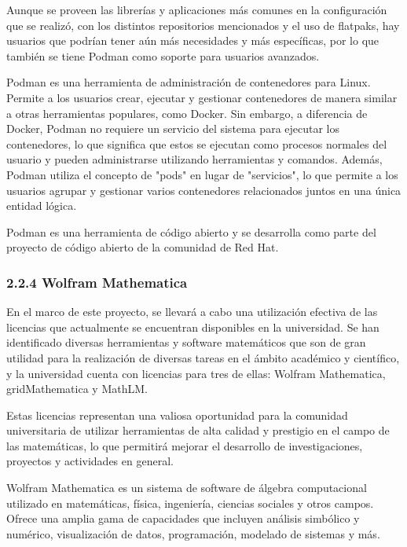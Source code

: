 \begin{spacing}{1.5}
    Aunque se proveen las librerías y aplicaciones más comunes en la configuración que se realizó, con los distintos repositorios mencionados y el uso de flatpaks, hay usuarios que podrían tener aún más necesidades y más específicas, por lo que también se tiene Podman como soporte para usuarios avanzados.

    Podman es una herramienta de administración de contenedores para Linux. Permite a los usuarios crear, ejecutar y gestionar contenedores de manera similar a otras herramientas populares, como Docker. Sin embargo, a diferencia de Docker, Podman no requiere un servicio del sistema para ejecutar los contenedores, lo que significa que estos se ejecutan como procesos normales del usuario y pueden administrarse utilizando herramientas y comandos. Además, Podman utiliza el concepto de "pods" en lugar de "servicios", lo que permite a los usuarios agrupar y gestionar varios contenedores relacionados juntos en una única entidad lógica. 
    
    Podman es una herramienta de código abierto y se desarrolla como parte del proyecto de código abierto de la comunidad de Red Hat. \cite{RHEL-podman-1}

    \subsubsection{2.2.4 Wolfram Mathematica}

    En el marco de este proyecto, se llevará a cabo una utilización efectiva de las licencias que actualmente se encuentran disponibles en la universidad. Se han identificado diversas herramientas y software matemáticos que son de gran utilidad para la realización de diversas tareas en el ámbito académico y científico, y la universidad cuenta con licencias para tres de ellas: Wolfram Mathematica, gridMathematica y MathLM.

    Estas licencias representan una valiosa oportunidad para la comunidad universitaria de utilizar herramientas de alta calidad y prestigio en el campo de las matemáticas, lo que permitirá mejorar el desarrollo de investigaciones, proyectos y actividades en general.
    
    Wolfram Mathematica es un sistema de software de álgebra computacional utilizado en matemáticas, física, ingeniería, ciencias sociales y otros campos. Ofrece una amplia gama de capacidades que incluyen análisis simbólico y numérico, visualización de datos, programación, modelado de sistemas y más. \cite{Wolfram-mathematica-1}
    

\end{spacing}
